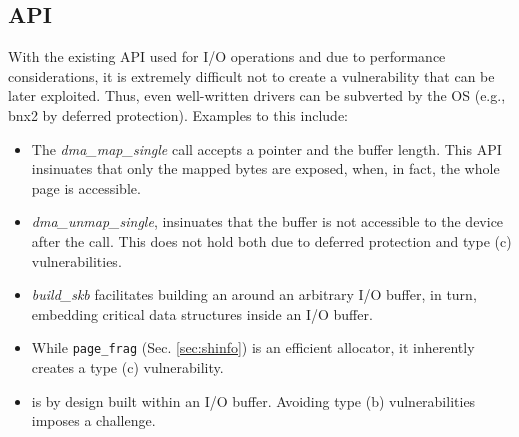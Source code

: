 \subsection{API}\label{sec:api}

With the existing API used for I/O operations and due to performance considerations, it is extremely difficult not to create a \subpage{} vulnerability that can be later exploited. Thus, even well-written drivers can be subverted by the OS (e.g., bnx2 by deferred protection). Examples to this include:

    \begin{itemize}[wide, labelwidth=!, labelindent=3pt]
        \item The \textit{dma\_map\_single} call accepts a pointer and the buffer length. This API insinuates that only the mapped bytes are exposed, when, in fact, the whole page is accessible.
        \item \textit{dma\_unmap\_single}, insinuates that the buffer is not accessible to the device after the call. This does not hold both due to deferred protection and type (c) \subpage{} vulnerabilities.
        \item \textit{build\_skb} facilitates building an \skb{} around an arbitrary I/O buffer, in turn, embedding critical data structures inside an I/O buffer.
        \item While \texttt{page\_frag} (Sec. \ref{sec:shinfo}) is an efficient allocator, it inherently creates a type (c) \subpage{} vulnerability.
            \item \shinfo{} is by design built within an I/O buffer. Avoiding type (b) \subpage{} vulnerabilities imposes a challenge.
    \end{itemize}


